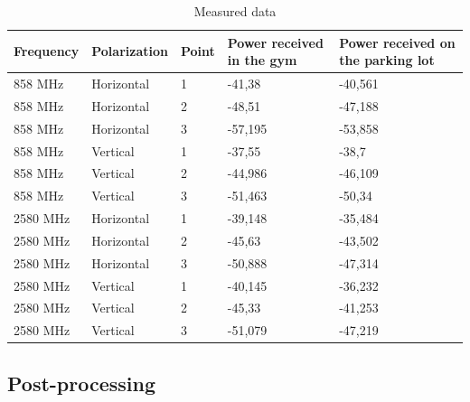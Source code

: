 \begin{table}[H]
\centering
\label{my-label}
\begin{tabular}{|l|l|l|p{3.5cm}|p{3.5cm}|}
\hline
\textbf{Frequency} & \textbf{Polarization} & \textbf{Point} & \textbf{Power received in the gym} & \textbf{Power received on the parking lot} \\ \hline
858 MHz            & Horizontal            & 1              & -41,38		& -40,561		\\ \hline
858 MHz            & Horizontal            & 2              & -48,51		& -47,188		\\ \hline
858 MHz            & Horizontal            & 3              & -57,195 		& -53,858		\\ \hline
858 MHz            & Vertical              & 1              & -37,55 		& -38,7			\\ \hline
858 MHz            & Vertical              & 2              & -44,986		& -46,109		\\ \hline
858 MHz            & Vertical              & 3              & -51,463		& -50,34		\\ \hline
2580 MHz           & Horizontal            & 1              & -39,148		& -35,484		\\ \hline
2580 MHz           & Horizontal            & 2              & -45,63		& -43,502		\\ \hline
2580 MHz           & Horizontal            & 3              & -50,888		& -47,314		\\ \hline
2580 MHz           & Vertical              & 1              & -40,145		& -36,232		\\ \hline
2580 MHz           & Vertical              & 2              & -45,33		& -41,253		\\ \hline
2580 MHz           & Vertical              & 3              & -51,079		& -47,219		\\ \hline
\end{tabular}
\caption{Measured data}
\label{tab:data}
\end{table}

\subsection{Post-processing}

